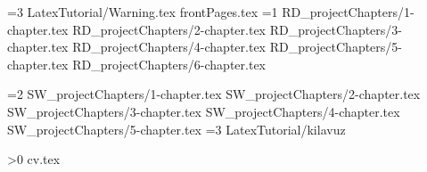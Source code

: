 \documentclass[a4paper,12pt,oneside,openany]{book}
\begin{document}
\newcommand{\projecttype}{2}
\ifnum\projecttype=3
 {LatexTutorial/Warning.tex}
\else
 {frontPages.tex}
\fi
\ifnum\projecttype=1
 {RD_projectChapters/1-chapter.tex}
 {RD_projectChapters/2-chapter.tex}
 {RD_projectChapters/3-chapter.tex}
 {RD_projectChapters/4-chapter.tex}
 {RD_projectChapters/5-chapter.tex}
 {RD_projectChapters/6-chapter.tex}

\fi
\ifnum\projecttype=2
 {SW_projectChapters/1-chapter.tex}
 {SW_projectChapters/2-chapter.tex}
 {SW_projectChapters/3-chapter.tex}
 {SW_projectChapters/4-chapter.tex}
 {SW_projectChapters/5-chapter.tex}
\fi
\ifnum\projecttype=3
 {LatexTutorial/kilavuz}
\fi

\newpage\appendix


\newpage
{}
\singlespacing
\printbibliography[title={\bibName}]

\ifnum{}
\newpage
{}

\ifnum\projecttype>0
 {cv.tex}
\fi
\fi
\end{document}
